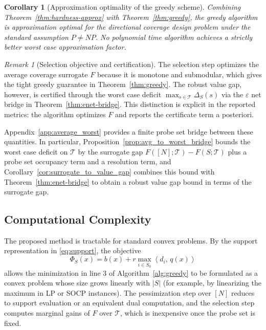 \documentclass[accepted]{uai2026}
\theoremstyle{plain}
\newtheorem{corollary}[theorem]{Corollary}
\theoremstyle{definition}
\theoremstyle{remark}
\newtheorem{remark}[theorem]{Remark}
\newcommand{\ip}[2]{\left\langle #1 ,\, #2 \right\rangle}
\begin{document}
\begin{corollary}[Approximation optimality of the greedy scheme]\label{cor:greedy-optimal}
Combining Theorem~\ref{thm:hardness-approx} with Theorem~\ref{thm:greedy}, the greedy algorithm is approximation optimal for the directional coverage design problem under the standard assumption $P\neq NP$. No polynomial time algorithm achieves a strictly better worst case approximation factor.
\end{corollary}

\begin{remark}[Selection objective and certification]\label{rmk:selection-vs-cert}
The selection step optimizes the average coverage surrogate $F$ because it is monotone and submodular, which gives the tight greedy guarantee in Theorem~\ref{thm:greedy}. The robust value gap, however, is certified through the worst case deficit $\max_{s\in\mathcal T}\Delta_S(s)$ via the $\varepsilon$ net bridge in Theorem~\ref{thm:enet-bridge}. This distinction is explicit in the reported metrics: the algorithm optimizes $F$ and reports the certificate term a posteriori.

Appendix~\ref{app:average_worst} provides a finite probe set bridge between these quantities. In particular, Proposition~\ref{prop:avg_to_worst_bridge} bounds the worst case deficit on $\mathcal T$ by the surrogate gap $F([N];\mathcal T)-F(S;\mathcal T)$ plus a probe set occupancy term and a resolution term, and Corollary~\ref{cor:surrogate_to_value_gap} combines this bound with Theorem~\ref{thm:enet-bridge} to obtain a robust value gap bound in terms of the surrogate gap.
\end{remark}

\subsection{Computational Complexity}

The proposed method is tractable for standard convex problems. By the support representation in \eqref{eq:support}, the objective
\[
\Phi_S(x)=b(x)+r\max_{i\in S_0}\ip{d_i}{q(x)}
\]
allows the minimization in line 3 of Algorithm~\ref{alg:greedy} to be formulated as a convex problem whose size grows linearly with $|S|$ (for example, by linearizing the maximum in LP or SOCP instances). The pessimization step over $[N]$ reduces to support evaluation or an equivalent dual computation, and the selection step computes marginal gains of $F$ over $\mathcal T$, which is inexpensive once the probe set is fixed.
\end{document}
